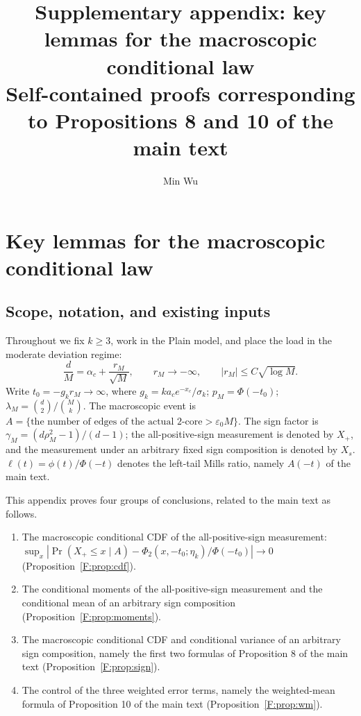 \documentclass[a4paper,11pt]{article}
\title{Supplementary appendix: key lemmas for the macroscopic conditional law\\\large Self-contained proofs corresponding to Propositions 8 and 10 of the main text}
\author{Min Wu}
\numberwithin{equation}{section}
\begin{document}
\maketitle

\setcounter{section}{5}
\renewcommand{\thesection}{\Alph{section}}
\section{Key lemmas for the macroscopic conditional law}\label{app:macro}

\subsection{Scope, notation, and existing inputs}

Throughout we fix $k\ge3$, work in the Plain model, and place the load in the moderate deviation regime:
\begin{equation}
\frac dM=\alpha_c+\frac{r_M}{\sqrt M},\qquad r_M\to-\infty,\qquad |r_M|\le C\sqrt{\log M}.\label{F:range}
\end{equation}
Write $t_0=-g_kr_M\to\infty$, where $g_k=ka_ce^{-x_c}/\sigma_k$; $p_M=\Phi(-t_0)$;
$\lambda_M=\binom d2/\binom Mk$. The macroscopic event is
$A=\{\text{the number of edges of the actual 2-core}>\varepsilon_0M\}$. The sign factor is
$\gamma_M=(d\rho_M^2-1)/(d-1)$; the all-positive-sign measurement is denoted by $X_+$, and the
measurement under an arbitrary fixed sign composition is denoted by $X_s$. $\ell(t)=\phi(t)/\Phi(-t)$
denotes the left-tail Mills ratio, namely $A(-t)$ of the main text.

This appendix proves four groups of conclusions, related to the main text as follows.
\begin{enumerate}[label=(\arabic*)]
\item The macroscopic conditional CDF of the all-positive-sign measurement:
$\sup_x|\Pr(X_+\le x\mid A)-\Phi_2(x,-t_0;\eta_k)/\Phi(-t_0)|\to0$ (Proposition~\ref{F:prop:cdf}).
\item The conditional moments of the all-positive-sign measurement and the conditional mean of an arbitrary
sign composition (Proposition~\ref{F:prop:moments}).
\item The macroscopic conditional CDF and conditional variance of an arbitrary sign composition, namely the
first two formulas of Proposition 8 of the main text (Proposition~\ref{F:prop:sign}).
\item The control of the three weighted error terms, namely the weighted-mean formula of Proposition 10 of
the main text (Proposition~\ref{F:prop:wm}).
\end{enumerate}
\end{document}
